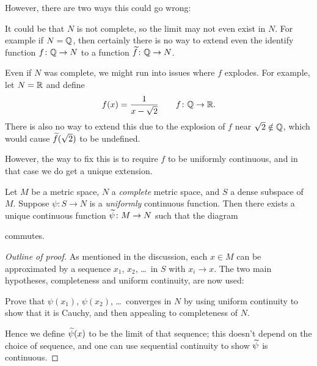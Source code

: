 However, there are two ways this could go wrong:
\begin{example}
	\listhack
	\begin{enumerate}[(a)]
		\ii It could be that $N$ is not complete,
		so the limit may not even exist in $N$.
		For example if $N = \mathbb Q$,
		then certainly there is no way to
		extend even the identify function $f \colon \mathbb Q \to N$
		to a function $\widetilde f \colon \mathbb Q \to N$.

		\ii Even if $N$ was complete, we might run into issues
		where $f$ explodes.
		For example, let $N = \mathbb R$ and define
		\[ f(x) = \frac{1}{x-\sqrt2} \qquad f \colon \mathbb Q \to \mathbb R. \]
		There is also no way to extend this
		due to the explosion of $f$ near $\sqrt2 \notin \mathbb Q$,
		which would cause $\widetilde f(\sqrt2)$ to be undefined.
	\end{enumerate}
\end{example}
However, the way to fix this is to require $f$ to be uniformly continuous,
and in that case we do get a unique extension.

\begin{theorem}
	Let $M$ be a metric space, $N$ a \emph{complete} metric space,
	and $S$ a dense subspace of $M$.
	Suppose $\psi \colon S \to N$ is a \emph{uniformly} continuous function.
	Then there exists a unique continuous function $\widetilde \psi \colon M \to N$
	such that the diagram
	\begin{center}
	\end{center}
	commutes.
\end{theorem}
\begin{proof}
	[Outline of proof]
	As mentioned in the discussion,
	each $x \in M$ can be approximated by a
	sequence $x_1$, $x_2$, \dots\ in $S$ with $x_i \to x$.
	The two main hypotheses, completeness and uniform continuity,
	are now used:
	\begin{exercise}
		Prove that $\psi(x_1)$, $\psi(x_2)$, \dots\ converges in $N$
		by using uniform continuity to show that it is Cauchy,
		and then appealing to completeness of $N$.
	\end{exercise}
	Hence we define $\widetilde \psi(x)$ to be the limit of that sequence;
	this doesn't depend on the choice of sequence,
	and one can use sequential continuity to show $\widetilde \psi$ is continuous.
\end{proof}

